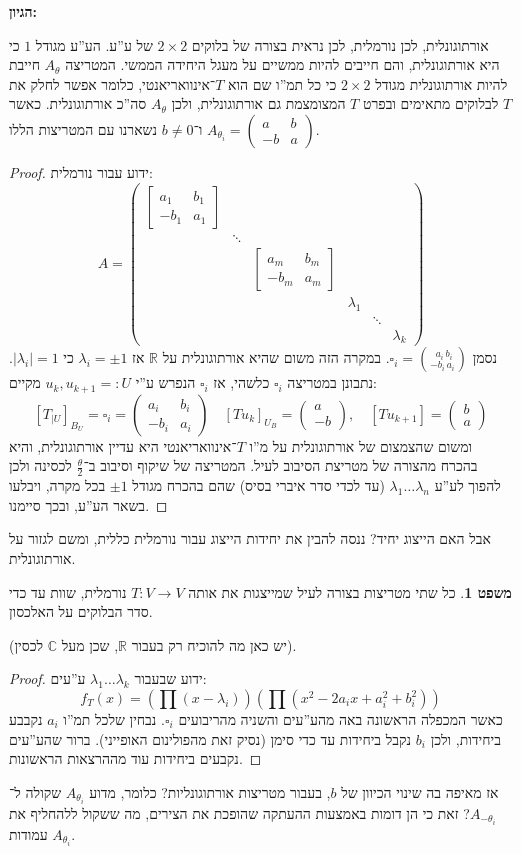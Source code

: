 \documentclass[a4paper]{article}
\newcommand\R     {\mathbb{R}}
\newcommand\C     {\mathbb{C}}
\newcommand\ta    {\theta}
\newcommand\co        {\colon}
\newcommand\pms[1]    {\begin{pmatrix}
		#1
\end{pmatrix}}
\newcommand\bms[1]    {\begin{bmatrix}
		#1
\end{bmatrix}}
\renewcommand\lg      {\lambda}
\newcommand\cl [1]    {\left ( #1 \right )}
\theoremstyle{definition}
\newtheorem{Theorem}{\color{myblue}משפט}
\newcommand\theo  [1] {\begin{Theorem}#1\end{Theorem}}
\begin{document}
	\textbf{הגיון: }
	
	אורתוגונלית, לכן נורמלית, לכן נראית בצורה של בלוקים $2 \times 2$ של ע''ע. הע''ע מגודל $1$ כי היא אורתוגונלית, והם חייבים להיות ממשיים על מעגל היחידה הממשי. המטריצה $A_{\ta}$ חייבת להיות אורתוגונלית מגודל $2 \times 2$ כי כל תמ''ו שם הוא $T$־אינוואריאנטי, כלומר אפשר לחלק את $T$ לבלוקים מתאימים ובפרט $T$ המצומצמת גם אורתוגונלית, ולכן $A_{\ta}$ סה''כ אורתוגונלית. כאשר $A_{\ta_i} = \pms{a & b \\ -b & a}$ ו־$b \neq 0$ נשארנו עם המטריצות הללו. 
	
	
	\begin{proof}
		ידוע עבור נורמלית: 
		\[ A = \pms{\bms{a_1 & b_1 \\ -b_1 & a_1} \\ & \ddots \\ &&\bms{a_m & b_m \\ -b_m & a_m} \\ &&& \lg_1 \\ &&&&\ddots \\ &&&&&\lg_k} \]
		נסמן $\square_i = \binom{\,\, a_i \, b_i}{-b_i \, a_i}$.
		במקרה הזה משום שהיא אורתוגונלית על $\R$ אז $\lg_i = \pm1$ כי $|\lg_i| = 1$. נתבונן במטריצה $\square_i$ כלשהי, אז $\square_i$ הנפרש ע''י $u_k, u_{k + 1} =: U$ מקיים: 
		\[ [T_{|U}]_{B_U} = \square_i = \pms{a_i & b_i \\ -b_i & a_i}\quad [Tu_k]_{U_B} = \pms{a \\ -b}, \quad [Tu_{k + 1}] = \pms{b \\ a} \]
		ומשום שהצמצום של אורתוגונלית על מ''ו $T$־אינוואריאנטי היא עדיין אורתוגונלית, והיא בהכרח מהצורה של מטריצת הסיבוב לעיל. המטריצה של שיקוף וסיבוב ב־$\frac{\ta}{2}$ לכסינה ולכן להפוך לע''ע $\lg_1 \dots \lg_n$ (עד לכדי סדר איברי בסיס) שהם בהכרח מגודל $\pm 1$ בכל מקרה, ויבלעו בשאר הע''ע, ובכך סיימנו. 
	\end{proof}
	
	אבל האם הייצוג יחיד? ננסה להבין את יחידות הייצוג עבור נורמלית כללית, ומשם לגזור על אורתוגונלית. 
	
	\theo{כל שתי מטריצות בצורה לעיל שמייצגות את אותה $T \co V \to V$ נורמלית, שוות עד כדי סדר הבלוקים על האלכסון. }
	
	(יש כאן מה להוכיח רק בעבור $\R$, שכן מעל $\C$ לכסין). 
	\begin{proof}
		ידוע שבעבור $\lg_1 \dots \lg_k$ ע''עים: 
		\[ f_T(x) = \cl{\prod (x - \lg_i)} \cl{\prod (x^2 - 2a_ix + a_i^2 + b_i^2)} \]
		כאשר המכפלה הראשונה באה מהע''עים והשניה מהריבועים $\square_i$. נבחין שלכל תמ''ו $a_i$ נקבבע ביחידות, ולכן $b_i$ נקבל ביחידות עד כדי סימן (נסיק זאת מהפולינום האופייני). ברור שהע''עים נקבעים ביחידות עוד מההרצאות הראשונות. 
	\end{proof}
	אז מאיפה בה שינוי הכיוון של $b$, בעבור מטריצות אורתוגונליות? כלומר, מדוע $A_{\ta_i}$ שקולה ל־$A_{-\ta_i}$? זאת כי הן דומות באמצעות ההעתקה שהופכת את הצירים, מה ששקול ללהחליף את עמודות $A_{\ta_i}$. 
	
\end{document}
